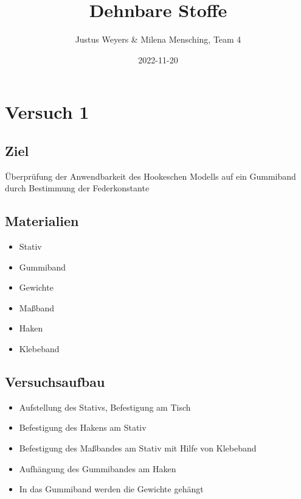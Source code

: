 \documentclass[
  9pt,
]{article}
\title{Dehnbare Stoffe}
\author{Justus Weyers \& Milena Mensching, Team 4}
\date{2022-11-20}
\providecommand{\tightlist}{%
  \setlength{\itemsep}{0pt}\setlength{\parskip}{0pt}}
\begin{document}
\maketitle

\hypertarget{versuch-1}{%
\section{Versuch 1}\label{versuch-1}}

\hypertarget{ziel}{%
\subsection{Ziel}\label{ziel}}

Überprüfung der Anwendbarkeit des Hookeschen Modells auf ein Gummiband
durch Bestimmung der Federkonstante

\hypertarget{materialien}{%
\subsection{Materialien}\label{materialien}}

\begin{itemize}
\tightlist
\item
  Stativ
\item
  Gummiband
\item
  Gewichte
\item
  Maßband
\item
  Haken
\item
  Klebeband
\end{itemize}

\hypertarget{versuchsaufbau}{%
\subsection{Versuchsaufbau}\label{versuchsaufbau}}

\begin{itemize}
\tightlist
\item
  Aufstellung des Stativs, Befestigung am Tisch
\item
  Befestigung des Hakens am Stativ
\item
  Befestigung des Maßbandes am Stativ mit Hilfe von Klebeband
\item
  Aufhängung des Gummibandes am Haken
\item
  In das Gummiband werden die Gewichte gehängt
\end{itemize}
\end{document}
